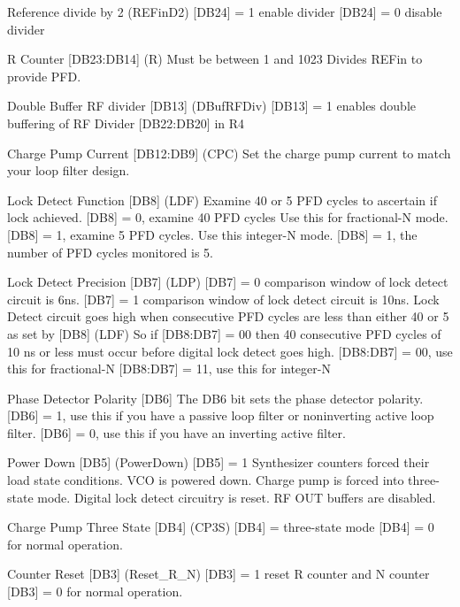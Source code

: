 Reference divide by 2 (R\+E\+Fin\+D2) \mbox{[}D\+B24\mbox{]} = 1 enable divider \mbox{[}D\+B24\mbox{]} = 0 disable divider

R Counter \mbox{[}D\+B23\+:D\+B14\mbox{]} (R) Must be between 1 and 1023 Divides R\+E\+Fin to provide P\+FD.

Double Buffer RF divider \mbox{[}D\+B13\mbox{]} (D\+Buf\+R\+F\+Div) \mbox{[}D\+B13\mbox{]} = 1 enables double buffering of RF Divider \mbox{[}D\+B22\+:D\+B20\mbox{]} in R4

Charge Pump Current \mbox{[}D\+B12\+:D\+B9\mbox{]} (C\+PC) Set the charge pump current to match your loop filter design.

Lock Detect Function \mbox{[}D\+B8\mbox{]} (L\+DF) Examine 40 or 5 P\+FD cycles to ascertain if lock achieved. \mbox{[}D\+B8\mbox{]} = 0, examine 40 P\+FD cycles Use this for fractional-\/N mode. \mbox{[}D\+B8\mbox{]} = 1, examine 5 P\+FD cycles. Use this integer-\/N mode. \mbox{[}D\+B8\mbox{]} = 1, the number of P\+FD cycles monitored is 5.

Lock Detect Precision \mbox{[}D\+B7\mbox{]} (L\+DP) \mbox{[}D\+B7\mbox{]} = 0 comparison window of lock detect circuit is 6ns. \mbox{[}D\+B7\mbox{]} = 1 comparison window of lock detect circuit is 10ns. Lock Detect circuit goes high when consecutive P\+FD cycles are less than either 40 or 5 as set by \mbox{[}D\+B8\mbox{]} (L\+DF) So if \mbox{[}D\+B8\+:D\+B7\mbox{]} = 00 then 40 consecutive P\+FD cycles of 10 ns or less must occur before digital lock detect goes high. \mbox{[}D\+B8\+:D\+B7\mbox{]} = 00, use this for fractional-\/N \mbox{[}D\+B8\+:D\+B7\mbox{]} = 11, use this for integer-\/N

Phase Detector Polarity \mbox{[}D\+B6\mbox{]} The D\+B6 bit sets the phase detector polarity. \mbox{[}D\+B6\mbox{]} = 1, use this if you have a passive loop filter or noninverting active loop filter. \mbox{[}D\+B6\mbox{]} = 0, use this if you have an inverting active filter.

Power Down \mbox{[}D\+B5\mbox{]} (Power\+Down) \mbox{[}D\+B5\mbox{]} = 1 Synthesizer counters forced their load state conditions. V\+CO is powered down. Charge pump is forced into three-\/state mode. Digital lock detect circuitry is reset. RF O\+UT buffers are disabled.

Charge Pump Three State \mbox{[}D\+B4\mbox{]} (C\+P3S) \mbox{[}D\+B4\mbox{]} = three-\/state mode \mbox{[}D\+B4\mbox{]} = 0 for normal operation.

Counter Reset \mbox{[}D\+B3\mbox{]} (Reset\+\_\+\+R\+\_\+N) \mbox{[}D\+B3\mbox{]} = 1 reset R counter and N counter \mbox{[}D\+B3\mbox{]} = 0 for normal operation. 

